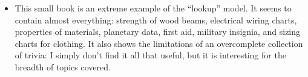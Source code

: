 \begin{itemize}
\item {}
  This small book is an extreme example of the ``lookup'' model. It
  seems to contain almost everything: strength of wood beams,
  electrical wiring charts, properties of materials, planetary data,
  first aid, military insignia, and sizing charts for clothing.  It
  also shows the limitations of an overcomplete collection of trivia:
  I simply don't find it all that useful, but it is interesting for
  the breadth of topics covered.


% 
% 
% 
\end{itemize}
